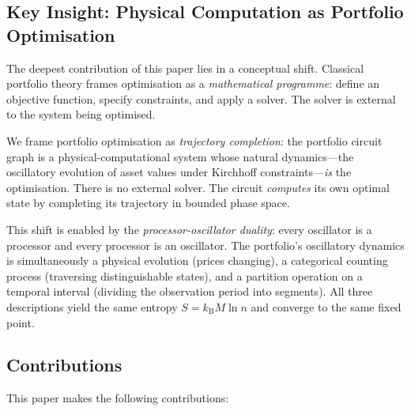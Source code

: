 \documentclass[twocolumn,10pt]{article}
\theoremstyle{remark}
\newcommand{\kB}{k_{\mathrm{B}}}
\begin{document}
\subsection{Key Insight: Physical Computation as Portfolio Optimisation}

The deepest contribution of this paper lies in a conceptual shift.  Classical portfolio theory frames optimisation as a \emph{mathematical programme}: define an objective function, specify constraints, and apply a solver.  The solver is external to the system being optimised.

We frame portfolio optimisation as \emph{trajectory completion}: the portfolio circuit graph is a physical-computational system whose natural dynamics---the oscillatory evolution of asset values under Kirchhoff constraints---\emph{is} the optimisation.  There is no external solver.  The circuit \emph{computes} its own optimal state by completing its trajectory in bounded phase space.

This shift is enabled by the \emph{processor-oscillator duality}: every oscillator is a processor and every processor is an oscillator.  The portfolio's oscillatory dynamics is simultaneously a physical evolution (prices changing), a categorical counting process (traversing distinguishable states), and a partition operation on a temporal interval (dividing the observation period into segments).  All three descriptions yield the same entropy $S = \kB M \ln n$ and converge to the same fixed point.

\subsection{Contributions}

This paper makes the following contributions:
\end{document}

